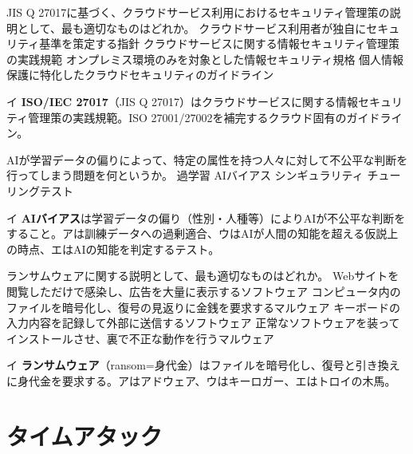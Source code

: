 
\begin{itpmon}{%
JIS Q 27017に基づく、クラウドサービス利用におけるセキュリティ管理策の説明として、最も適切なものはどれか。}
\sentakushi
  {クラウドサービス利用者が独自にセキュリティ基準を策定する指針}
  {クラウドサービスに関する情報セキュリティ管理策の実践規範}
  {オンプレミス環境のみを対象とした情報セキュリティ規格}
  {個人情報保護に特化したクラウドセキュリティのガイドライン}
\end{itpmon}
\begin{kaisetsu}{イ}
\textbf{ISO/IEC 27017}（JIS Q 27017）はクラウドサービスに関する情報セキュリティ管理策の実践規範。ISO 27001/27002を補完するクラウド固有のガイドライン。
\end{kaisetsu}

\begin{itpmon}{%
AIが学習データの偏りによって、特定の属性を持つ人々に対して不公平な判断を行ってしまう問題を何というか。}
\sentakushi
  {過学習}
  {AIバイアス}
  {シンギュラリティ}
  {チューリングテスト}
\end{itpmon}
\begin{kaisetsu}{イ}
\textbf{AIバイアス}は学習データの偏り（性別・人種等）によりAIが不公平な判断をすること。アは訓練データへの過剰適合、ウはAIが人間の知能を超える仮説上の時点、エはAIの知能を判定するテスト。
\end{kaisetsu}

\begin{itpmon}{%
ランサムウェアに関する説明として、最も適切なものはどれか。}
\sentakushi
  {Webサイトを閲覧しただけで感染し、広告を大量に表示するソフトウェア}
  {コンピュータ内のファイルを暗号化し、復号の見返りに金銭を要求するマルウェア}
  {キーボードの入力内容を記録して外部に送信するソフトウェア}
  {正常なソフトウェアを装ってインストールさせ、裏で不正な動作を行うマルウェア}
\end{itpmon}
\begin{kaisetsu}{イ}
\textbf{ランサムウェア}（ransom=身代金）はファイルを暗号化し、復号と引き換えに身代金を要求する。アはアドウェア、ウはキーロガー、エはトロイの木馬。
\end{kaisetsu}

\section{タイムアタック}

